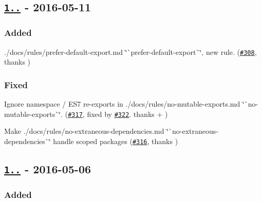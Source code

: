 \subsection*{\href{https://github.com/benmosher/eslint-plugin-import/compare/v1.7.0...v1.8.0}{\tt 1..} -\/ 2016-\/05-\/11}

\subsubsection*{Added}


\begin{DoxyItemize}
\item ./docs/rules/prefer-\/default-\/export.md \char`\"{}\`{}prefer-\/default-\/export\`{}\char`\"{}, new rule. (\href{https://github.com/benmosher/eslint-plugin-import/pull/308}{\tt \#308}, thanks \href{https://github.com/gavriguy}{\tt })
\end{DoxyItemize}

\subsubsection*{Fixed}


\begin{DoxyItemize}
\item Ignore namespace / E\+S7 re-\/exports in ./docs/rules/no-\/mutable-\/exports.md \char`\"{}\`{}no-\/mutable-\/exports\`{}\char`\"{}. (\href{https://github.com/benmosher/eslint-plugin-import/issues/317}{\tt \#317}, fixed by \href{https://github.com/benmosher/eslint-plugin-import/pull/322}{\tt \#322}. thanks \href{https://github.com/borisyankov}{\tt } + \href{https://github.com/jfmengels}{\tt })
\item Make ./docs/rules/no-\/extraneous-\/dependencies.md \char`\"{}\`{}no-\/extraneous-\/dependencies\`{}\char`\"{} handle scoped packages (\href{https://github.com/benmosher/eslint-plugin-import/pull/316}{\tt \#316}, thanks \href{https://github.com/jfmengels}{\tt })
\end{DoxyItemize}

\subsection*{\href{https://github.com/benmosher/eslint-plugin-import/compare/v1.6.1...v1.7.0}{\tt 1..} -\/ 2016-\/05-\/06}

\subsubsection*{Added}


